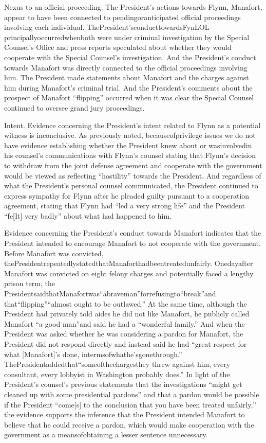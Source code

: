 
Nexus to an official proceeding.
The President's actions towards Flynn, Manafort, appear to have been connected to pendingoranticipated official proceedings involving each individual.
ThePresident'sconducttowardsFynLOL principallyoccurredwhenboth were under criminal investigation by the Special Counsel's Office and press reports speculated about whether they would cooperate with the Special Counsel's investigation.
And the President's conduct towards Manafort was directly connected to the official proceedings involving him.
The President made statements about Manafort and the charges against him during Manafort's criminal trial.
And the President's comments about the prospect of Manafort “flipping” occurred when it was clear the Special Counsel continued to oversee grand jury proceedings.

Intent.
Evidence concerning the President's intent related to Flynn as a potential witness is inconclusive.
As previously noted, becauseofprivilege issues we do not have evidence establishing whether the President knew about or wasinvolvedin his counsel's communications with Flynn's counsel stating that Flynn's decision to withdraw from the joint defense agreement and cooperate with the government would be viewed as reflecting “hostility” towards the President.
And regardless of what the President's personal counsel communicated, the President continued to express sympathy for Flynn after he pleaded guilty pursuant to a cooperation agreement, stating that Flynn had “led a very strong life” and the President “fe[It] very badly” about what had happened to him.

Evidence concerning the President's conduct towards Manafort indicates that the President intended to encourage Manafort to not cooperate with the government.
Before Manafort was convicted, thePresidentrepeatedlystatedthatManaforthadbeentreatedunfairly.
Onedayafter Manafort was convicted on eight felony charges and potentially faced a lengthy prison term, the PresidentsaidthatManafortwas“abraveman”forrefusingto“break”and that“flipping”“almost ought to be outlawed.”
At the same time, although the President had privately told aides he did not like Manafort, he publicly called Manafort “a good man”and said he had a “wonderful family.”
And when the President was asked whether he was considering a pardon for Manafort, the President did not respond directly and instead said he had “great respect for what [Manafort]'s done, intermsofwhathe'sgonethrough.”
ThePresidentaddedthat“someofthechargesthey threw against him, every consultant, every lobbyist in Washington probably does.”
In light of the President's counsel's previous statements that the investigations “might get cleaned up with some presidential pardons” and that a pardon would be possible if the President “come[s] to the conclusion that you have been treated unfairly,” the evidence supports the inference that the President intended Manafort to believe that he could receive a pardon, which would make cooperation with the government as a meansofobtaining a lesser sentence unnecessary.

